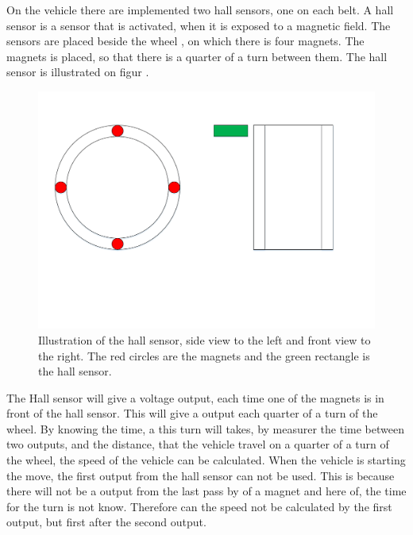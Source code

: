On the vehicle there are implemented two hall sensors, one on each belt. A hall sensor is a sensor that is activated, when it is exposed to a magnetic field. The sensors are placed beside the wheel , on which there is four magnets. The magnets is placed, so that there is a quarter of a turn between them. The hall sensor is illustrated on figur .

 \begin{figure}[H]
	\centering
	\includegraphics[scale=0.5]{figures/HallSensorSide_Forward_view.pdf}
	\caption{Illustration of the hall sensor, side view to the left and front view to the right. The red circles are the magnets and the green rectangle is the hall sensor.}
	\label{fig:HallSensor}
\end{figure}

The Hall sensor will give a voltage output, each time one of the magnets is in front of the hall sensor. This will give a output each quarter of a turn of the wheel. By knowing the time, a this turn will takes, by measurer the time between two outputs, and the distance, that the vehicle travel on a quarter of a turn of the wheel, the speed of the vehicle can be calculated.
When the vehicle is starting the move, the first output from the hall sensor can not be used. This is because there will not be a output from the last pass by of a magnet and here of, the time for the turn is not know. Therefore can the speed not be calculated by the first output, but first after the second output.

